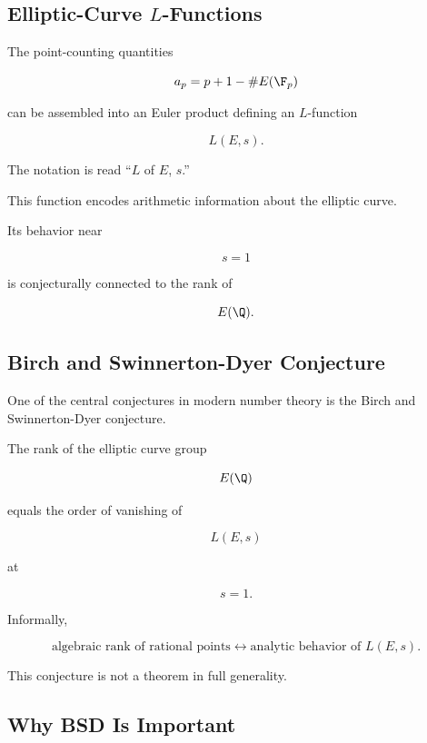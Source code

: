 \subsection{Elliptic-Curve \(L\)-Functions}
\label{subsec:elliptic-l-functions}

The point-counting quantities

\[ a_p=p+1-\#E(\F_p) \]

can be assembled into an Euler product defining an \(L\)-function

\[ L(E,s). \]

The notation is read ``\(L\) of \(E\), \(s\).''

This function encodes arithmetic information about the elliptic curve.

Its behavior near

\[ s=1 \]

is conjecturally connected to the rank of

\[ E(\Q). \]

\subsection{Birch and Swinnerton-Dyer Conjecture}
\label{subsec:bsd-conjecture}

One of the central conjectures in modern number theory is the
Birch and Swinnerton-Dyer conjecture.

\begin{conjecture}
The rank of the elliptic curve group

\[ E(\Q) \]

equals the order of vanishing of

\[ L(E,s) \]

at

\[ s=1. \]
\end{conjecture}

Informally,

\[
\boxed{
\text{algebraic rank of rational points}
\longleftrightarrow
\text{analytic behavior of }L(E,s).
}
\]

This conjecture is not a theorem in full generality.

\subsection{Why BSD Is Important}
\label{subsec:why-bsd-important}

